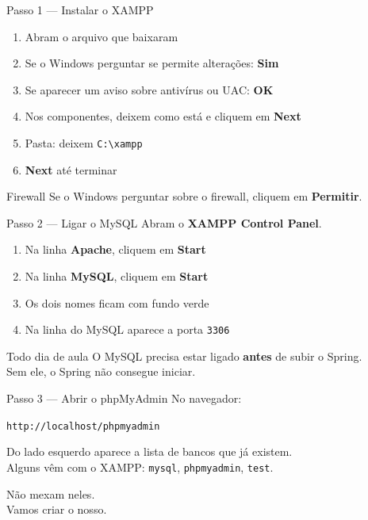 \documentclass[aspectratio=169,11pt]{beamer}
\begin{document}
\begin{frame}{Passo 1 --- Instalar o XAMPP}
  \begin{enumerate}
    \item Abram o arquivo que baixaram
    \item Se o Windows perguntar se permite alterações: \textbf{Sim}
    \item Se aparecer um aviso sobre antivírus ou UAC: \textbf{OK}
    \item Nos componentes, deixem como está e cliquem em \textbf{Next}
    \item Pasta: deixem \texttt{C:\textbackslash xampp}
    \item \textbf{Next} até terminar
  \end{enumerate}

  \vspace{0.5em}
  \begin{alertblock}{Firewall}
    Se o Windows perguntar sobre o firewall, cliquem em \textbf{Permitir}.
  \end{alertblock}
\end{frame}

\begin{frame}{Passo 2 --- Ligar o MySQL}
  Abram o \textbf{XAMPP Control Panel}.

  \vspace{0.5em}
  \begin{enumerate}
    \item Na linha \textbf{Apache}, cliquem em \textbf{Start}
    \item Na linha \textbf{MySQL}, cliquem em \textbf{Start}
    \item Os dois nomes ficam com fundo verde
    \item Na linha do MySQL aparece a porta \texttt{3306}
  \end{enumerate}

  \vspace{0.5em}
  \begin{block}{Todo dia de aula}
    O MySQL precisa estar ligado \textbf{antes} de subir o Spring.\\
    Sem ele, o Spring não consegue iniciar.
  \end{block}
\end{frame}

\begin{frame}{Passo 3 --- Abrir o phpMyAdmin}
  No navegador:

  \vspace{0.4em}
  \begin{center}
    \large\texttt{http://localhost/phpmyadmin}
  \end{center}

  \vspace{0.5em}
  Do lado esquerdo aparece a lista de bancos que já existem.\\
  Alguns vêm com o XAMPP: \texttt{mysql}, \texttt{phpmyadmin}, \texttt{test}.

  \vspace{0.5em}
  Não mexam neles.\\
  Vamos criar o nosso.
\end{frame}
\end{document}

